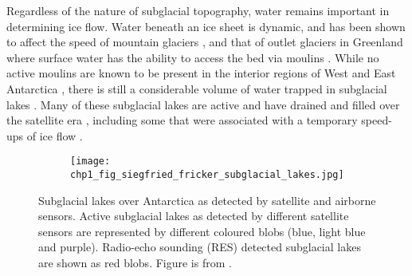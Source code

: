 Regardless of the nature of subglacial topography, water remains important in determining ice flow.
Water beneath an ice sheet is dynamic, and has been shown to affect the speed of mountain glaciers \citep[e.g.][]{IkenUpliftUnteraargletscherBeginning1983}, and that of outlet glaciers in Greenland where surface water has the ability to access the bed via moulins \citep{ZwallySurfaceMeltInducedAcceleration2002}.
While no active moulins are known to be present in the interior regions of West and East Antarctica \citep{DirscherlAutomatedMappingAntarctic2020,StokesWidespreaddistributionsupraglacial2019}, there is still a considerable volume of water trapped in subglacial lakes \citep{WrightfourthinventoryAntarctic2012}.
Many of these subglacial lakes are active and have drained and filled over the satellite era \citep[Fig.~\ref{fig:1.4},][]{Smithinventoryactivesubglacial2009,SiegfriedThirteenyearssubglacial2018}, including some that were associated with a temporary speed-ups of ice flow \citep[e.g.][]{Scambostriggeringsubglaciallake2011,BellLargesubglaciallakes2007,StearnsIncreasedflowspeed2008,WrightSubglacialhydrologicalconnectivity2014}.

\begin{figure}[htbp]
  \centering
  \begin{subfigure}[t]{1.0\textwidth}
    \texttt{[image: chp1\_fig\_siegfried\_fricker\_subglacial\_lakes.jpg]}
    \label{fig:1.4a}
  \end{subfigure}
  \caption[Map of radio-echo sounding and satellite-detected subglacial lakes in Antarctica]{
    Subglacial lakes over Antarctica as detected by satellite and airborne sensors.
    Active subglacial lakes as detected by different satellite sensors are represented by different coloured blobs (blue, light blue and purple).
    Radio-echo sounding (RES) detected subglacial lakes are shown as red blobs.
    Figure is from \citet{SiegfriedThirteenyearssubglacial2018}.
  }
  \label{fig:1.4}
\end{figure}

